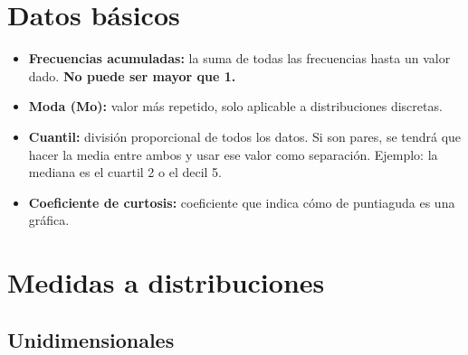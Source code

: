 \documentclass[a4paper, twocolumn, 10pt]{article}
\begin{document}
	
\setlength{\belowdisplayskip}{0pt} \setlength{\belowdisplayshortskip}{0pt} 
\setlength{\abovedisplayskip}{0pt} \setlength{\abovedisplayshortskip}{0pt} %
	
\section{Datos básicos}
\begin{itemize}
	\item \textbf{Frecuencias acumuladas:} la suma de todas las frecuencias hasta un valor dado. \textbf{No puede ser mayor que 1.}
	\item \textbf{Moda (Mo):} valor más repetido, solo aplicable a distribuciones discretas.
	\item \textbf{Cuantil:} división proporcional de todos los datos. Si son pares, se tendrá que hacer la media entre ambos y usar ese valor como separación. Ejemplo: la mediana es el cuartil 2 o el decil 5.
	\item \textbf{Coeficiente de curtosis:} coeficiente que indica cómo de puntiaguda es una gráfica.
\end{itemize}

\section{Medidas a distribuciones}
\subsection{Unidimensionales}
\end{document}
